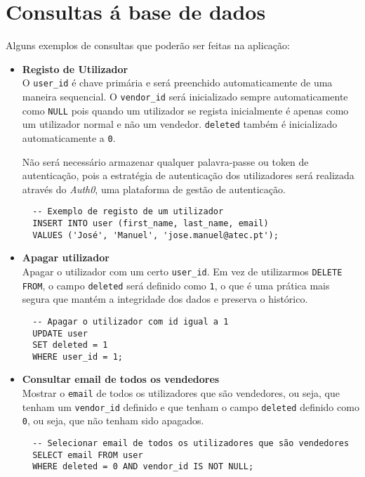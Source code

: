 ﻿\section{Consultas á base de dados} \label{section: Consultas}

Alguns exemplos de consultas que poderão ser feitas na aplicação:

\begin{itemize}
  \item \textbf{Registo de Utilizador}\\ 
  O \texttt{user\_id} é chave primária e será preenchido automaticamente de uma maneira sequencial. O  \texttt{vendor\_id} será inicializado sempre automaticamente como \texttt{NULL} pois quando um utilizador se regista inicialmente é apenas como um utilizador normal e não um vendedor. \texttt{deleted} também é inicializado automaticamente a \texttt{0}.
  \par
  Não será necessário armazenar qualquer palavra-passe ou token de autenticação, pois a estratégia de autenticação dos utilizadores será realizada através do \textit{Auth0}, uma plataforma de gestão de autenticação.
  
  \vspace{10pt}
    \begin{lstlisting}
  -- Exemplo de registo de um utilizador
  INSERT INTO user (first_name, last_name, email)
  VALUES ('José', 'Manuel', 'jose.manuel@atec.pt');
      \end{lstlisting}
  \item \textbf{Apagar utilizador}\\ 
      Apagar o utilizador com um certo \texttt{user\_id}. Em vez de utilizarmos \texttt{DELETE FROM}, o campo \texttt{deleted} será definido como \texttt{1}, o que é uma prática mais segura que mantém a integridade dos dados e preserva o histórico.
      \vspace{10pt}
      \begin{lstlisting}
  -- Apagar o utilizador com id igual a 1
  UPDATE user
  SET deleted = 1
  WHERE user_id = 1;        
        \end{lstlisting}    
  \item \textbf{Consultar email de todos os vendedores}\\ 
    Mostrar o \texttt{email} de todos os utilizadores que são vendedores, ou seja, que tenham um \texttt{vendor\_id} definido e que tenham o campo \texttt{deleted} definido como \texttt{0}, ou seja, que não tenham sido apagados.
    \vspace{10pt}
    \begin{lstlisting}
  -- Selecionar email de todos os utilizadores que são vendedores
  SELECT email FROM user
  WHERE deleted = 0 AND vendor_id IS NOT NULL;
      \end{lstlisting}


\end{itemize}
